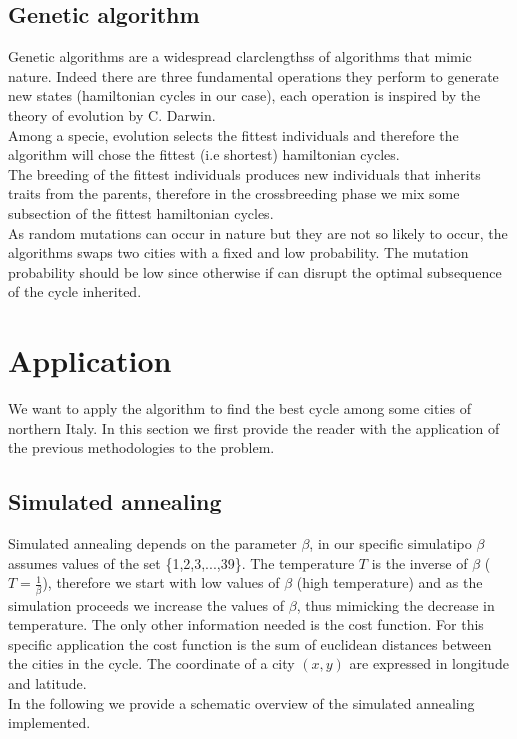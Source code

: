 \documentclass{article}
\begin{document}
\subsection{Genetic algorithm}
Genetic algorithms are a widespread clarclengthss of algorithms that mimic nature. Indeed there are three fundamental operations they perform to generate new states (hamiltonian cycles in our case), each operation is inspired by the theory of evolution by C. Darwin. \\
Among a specie, evolution selects the fittest individuals and therefore the algorithm will chose the fittest (i.e shortest) hamiltonian cycles. \\
The breeding of the fittest individuals produces new individuals that inherits traits from the parents, therefore in the crossbreeding phase we mix some subsection of the fittest hamiltonian cycles. \\
As random mutations can occur in nature but they are not so likely to occur, the algorithms swaps two cities with a fixed and low probability. The mutation probability should be low since otherwise if can disrupt the optimal subsequence of the cycle inherited. \\

\section{Application} 
We want to apply the algorithm to find the best cycle among some cities of northern Italy.
In this section we first provide the reader with the application of the previous methodologies to the problem. 

\subsection{Simulated annealing}
Simulated annealing depends on the parameter $\beta$, in our specific simulatipo $\beta$ assumes values of the set \{1,2,3,...,39\}.
The temperature $T$ is the inverse of $\beta$ ($T = \frac{1}{\beta}$), therefore we start with low values of $\beta$ (high temperature) and as the simulation proceeds we increase the values of $\beta$, thus mimicking the decrease in temperature.
The only other information needed is the cost function. For this specific application the cost function is the sum of euclidean distances between the cities in the cycle. The coordinate of a city $(x,y)$ are expressed in longitude and latitude.\\
In the following we provide a schematic overview of the simulated annealing implemented.
\end{document}
